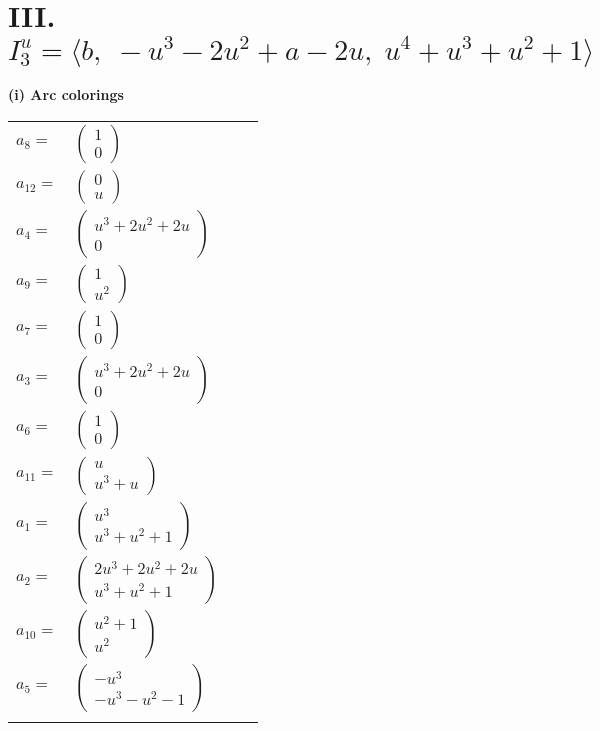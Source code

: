 \documentclass[1p]{elsarticle_modified}
\theoremstyle{definition}
\begin{document}
\centering \section*{III. $I^u_{3}= \langle b,\;- u^3-2 u^2+a-2 u,\;u^4+u^3+u^2+1 \rangle$}
\flushleft \textbf{(i) Arc colorings}\\
\begin{tabular}{m{7pt} m{180pt} m{7pt} m{180pt} }
\flushright $a_{8}=$&$\begin{pmatrix}1\\0\end{pmatrix}$ \\
\flushright $a_{12}=$&$\begin{pmatrix}0\\u\end{pmatrix}$ \\
\flushright $a_{4}=$&$\begin{pmatrix}u^3+2 u^2+2 u\\0\end{pmatrix}$ \\
\flushright $a_{9}=$&$\begin{pmatrix}1\\u^2\end{pmatrix}$ \\
\flushright $a_{7}=$&$\begin{pmatrix}1\\0\end{pmatrix}$ \\
\flushright $a_{3}=$&$\begin{pmatrix}u^3+2 u^2+2 u\\0\end{pmatrix}$ \\
\flushright $a_{6}=$&$\begin{pmatrix}1\\0\end{pmatrix}$ \\
\flushright $a_{11}=$&$\begin{pmatrix}u\\u^3+u\end{pmatrix}$ \\
\flushright $a_{1}=$&$\begin{pmatrix}u^3\\u^3+u^2+1\end{pmatrix}$ \\
\flushright $a_{2}=$&$\begin{pmatrix}2 u^3+2 u^2+2 u\\u^3+u^2+1\end{pmatrix}$ \\
\flushright $a_{10}=$&$\begin{pmatrix}u^2+1\\u^2\end{pmatrix}$ \\
\flushright $a_{5}=$&$\begin{pmatrix}- u^3\\- u^3- u^2-1\end{pmatrix}$\\&\end{tabular}
\end{document}
